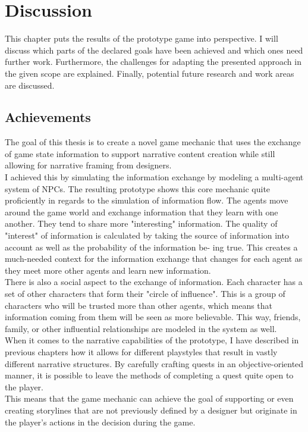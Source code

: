 \chapter{Discussion} %
This chapter puts the results of the prototype game into perspective. I will discuss which parts of the declared goals have been achieved and which ones need further work. Furthermore, the challenges for adapting the presented approach in the given scope are explained. Finally, potential future research and work areas are discussed.
\section{Achievements}
The goal of this thesis is to create a novel game mechanic that uses the exchange of game state information to support narrative content creation while still allowing for narrative framing from designers.\\
I achieved this by simulating the information exchange by modeling a multi-agent system of NPCs. The resulting prototype shows this core mechanic quite proficiently in regards to the simulation of information flow. The agents move around the game world and exchange information that they learn with one another. They tend to share more "interesting" information. The quality of "interest" of information is calculated by taking the source of information into account as well as the probability of the information be- ing true. This creates a much-needed context for the information exchange that changes for each agent as they meet more other agents and learn new information.\\
There is also a social aspect to the exchange of information. Each character has a set of other characters that form their "circle of influence". This is a group of characters who will be trusted more than other agents, which means that information coming from them will be seen as more believable. This way, friends, family, or other influential relationships are modeled in the system as well.\\
When it comes to the narrative capabilities of the prototype, I have described in previous chapters how it allows for different playstyles that result in vastly different narrative structures. By carefully crafting quests in an objective-oriented manner, it is possible to leave the methods of completing a quest quite open to the player.\\
This means that the game mechanic can achieve the goal of supporting or even creating storylines that are not previously defined by a designer but originate in the player’s actions in the decision during the game.\\
